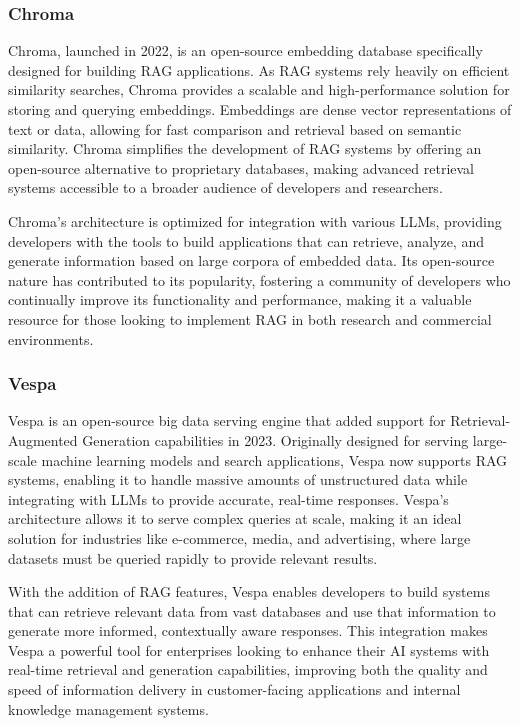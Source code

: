 \subsubsection{Chroma}

Chroma, launched in 2022, is an open-source embedding database specifically designed for building RAG applications. 
As RAG systems rely heavily on efficient similarity searches, Chroma provides a scalable and high-performance solution for storing and querying embeddings. 
Embeddings are dense vector representations of text or data, allowing for fast comparison and retrieval based on semantic similarity. 
Chroma simplifies the development of RAG systems by offering an open-source alternative to proprietary databases, making advanced retrieval systems accessible to a broader audience of developers and researchers.

Chroma’s architecture is optimized for integration with various LLMs, providing developers with the tools to build applications that can retrieve, analyze, and generate information based on large corpora of embedded data. 
Its open-source nature has contributed to its popularity, fostering a community of developers who continually improve its functionality and performance, making it a valuable resource for those looking to implement RAG in both research and commercial environments.

\subsubsection{Vespa}

Vespa is an open-source big data serving engine that added support for Retrieval-Augmented Generation capabilities in 2023. 
Originally designed for serving large-scale machine learning models and search applications, Vespa now supports RAG systems, enabling it to handle massive amounts of unstructured data while integrating with LLMs to provide accurate, real-time responses. 
Vespa’s architecture allows it to serve complex queries at scale, making it an ideal solution for industries like e-commerce, media, and advertising, where large datasets must be queried rapidly to provide relevant results.

With the addition of RAG features, Vespa enables developers to build systems that can retrieve relevant data from vast databases and use that information to generate more informed, contextually aware responses. 
This integration makes Vespa a powerful tool for enterprises looking to enhance their AI systems with real-time retrieval and generation capabilities, improving both the quality and speed of information delivery in customer-facing applications and internal knowledge management systems.

